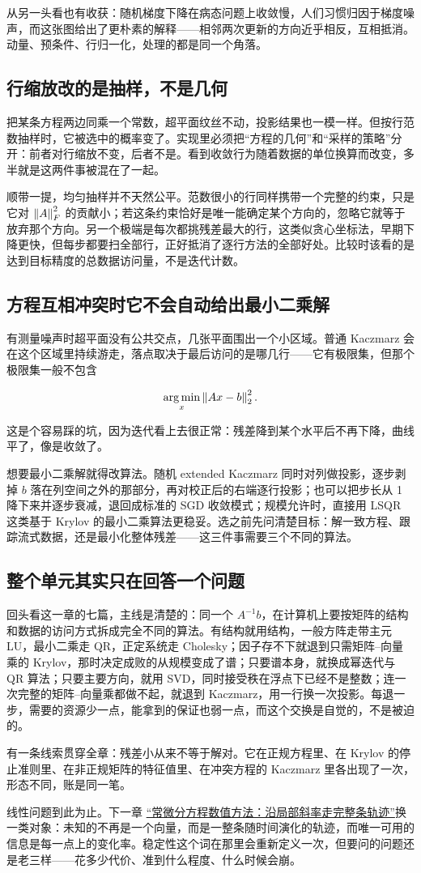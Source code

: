 从另一头看也有收获：随机梯度下降在病态问题上收敛慢，人们习惯归因于梯度噪声，而这张图给出了更朴素的解释——相邻两次更新的方向近乎相反，互相抵消。动量、预条件、行归一化，处理的都是同一个角落。

\subsection{行缩放改的是抽样，不是几何}

把某条方程两边同乘一个常数，超平面纹丝不动，投影结果也一模一样。但按行范数抽样时，它被选中的概率变了。实现里必须把``方程的几何''和``采样的策略''分开：前者对行缩放不变，后者不是。看到收敛行为随着数据的单位换算而改变，多半就是这两件事被混在了一起。

顺带一提，均匀抽样并不天然公平。范数很小的行同样携带一个完整的约束，只是它对 \(\left\lVert A\right\rVert_F^2\) 的贡献小；若这条约束恰好是唯一能确定某个方向的，忽略它就等于放弃那个方向。另一个极端是每次都挑残差最大的行，这类似贪心坐标法，早期下降更快，但每步都要扫全部行，正好抵消了逐行方法的全部好处。比较时该看的是达到目标精度的总数据访问量，不是迭代计数。

\subsection{方程互相冲突时它不会自动给出最小二乘解}

有测量噪声时超平面没有公共交点，几张平面围出一个小区域。普通 Kaczmarz 会在这个区域里持续游走，落点取决于最后访问的是哪几行——它有极限集，但那个极限集一般不包含

\[
\operatorname*{arg\,min}_x\left\lVert Ax-b\right\rVert_2^2 .
\]

这是个容易踩的坑，因为迭代看上去很正常：残差降到某个水平后不再下降，曲线平了，像是收敛了。

想要最小二乘解就得改算法。随机 extended Kaczmarz 同时对列做投影，逐步剥掉 \(b\) 落在列空间之外的那部分，再对校正后的右端逐行投影；也可以把步长从 1 降下来并逐步衰减，退回成标准的 SGD 收敛模式；规模允许时，直接用 LSQR 这类基于 Krylov 的最小二乘算法更稳妥。选之前先问清楚目标：解一致方程、跟踪流式数据，还是最小化整体残差——这三件事需要三个不同的算法。

\subsection{整个单元其实只在回答一个问题}

回头看这一章的七篇，主线是清楚的：同一个 \(A^{-1}b\)，在计算机上要按矩阵的结构和数据的访问方式拆成完全不同的算法。有结构就用结构，一般方阵走带主元 LU，最小二乘走 QR，正定系统走 Cholesky；因子存不下就退到只需矩阵--向量乘的 Krylov，那时决定成败的从规模变成了谱；只要谱本身，就换成幂迭代与 QR 算法；只要主要方向，就用 SVD，同时接受秩在浮点下已经不是整数；连一次完整的矩阵--向量乘都做不起，就退到 Kaczmarz，用一行换一次投影。每退一步，需要的资源少一点，能拿到的保证也弱一点，而这个交换是自觉的，不是被迫的。

有一条线索贯穿全章：残差小从来不等于解对。它在正规方程里、在 Krylov 的停止准则里、在非正规矩阵的特征值里、在冲突方程的 Kaczmarz 里各出现了一次，形态不同，账是同一笔。

线性问题到此为止。下一章 \hyperref[ch:066]{``常微分方程数值方法：沿局部斜率走完整条轨迹''}换一类对象：未知的不再是一个向量，而是一整条随时间演化的轨迹，而唯一可用的信息是每一点上的变化率。稳定性这个词在那里会重新定义一次，但要问的问题还是老三样——花多少代价、准到什么程度、什么时候会崩。
